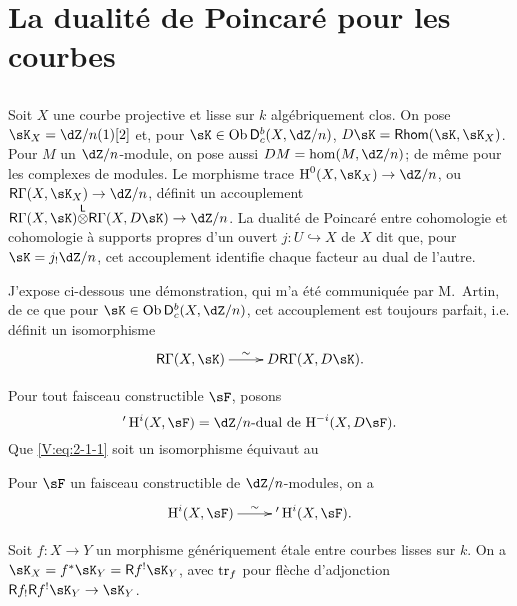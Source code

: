 \section{La dualité de Poincaré pour les courbes}\label{V:2}





\subsection{}\label{V:2-1}

Soit $X$ une courbe projective et lisse sur $k$ alg\'ebriquement clos. On pose 
$\sK_X=\dZ/n(1)[2]$ et, pour $\sK\in\ob \D_c^b(X,\dZ/n)$, 
$D\sK=\rHom(\sK,\sK_X)$. Pour $M$ un $\dZ/n$-module, on pose aussi 
$D M = \hom(M,\dZ/n)$; de m\^eme pour les complexes de modules. Le morphisme 
trace $\h^0(X,\sK_X) \to \dZ/n$, ou $\R\Gamma(X,\sK_X)\to \dZ/n$, d\'efinit un 
accouplement $\R\Gamma(X,\sK)\lotimes\R\Gamma(X,D\sK) \to \dZ/n$. La dualit\'e 
de Poincar\'e entre cohomologie et cohomologie \`a supports propres d'un ouvert 
$j:U\hookrightarrow X$ de $X$ dit que, pour $\sK=j_!\dZ/n$, cet accouplement 
identifie chaque facteur au dual de l'autre. 

J'expose ci-dessous une d\'emonstration, qui m'a \'et\'e communiqu\'ee par 
M.\ Artin, de ce que pour $\sK\in\ob\D_c^b(X,\dZ/n)$, cet accouplement est 
toujours parfait, i.e. d\'efinit un isomorphisme
\begin{equation}\label{V:eq:2-1-1}
\xymatrix{
  \R\Gamma(X,\sK) \ar[r]^-\sim 
    & D \R\Gamma(X,D\sK) \text{.}
}
\end{equation}

Pour tout faisceau constructible $\sF$, posons 
\[
  '\h^i(X,\sF) = \text{$\dZ/n$-dual de $\h^{-i}(X,D\sF)$.}
\]
Que \eqref{V:eq:2-1-1} soit un isomorphisme \'equivaut au 





\begin{theorem_}\label{V:2-2}
Pour $\sF$ un faisceau constructible de $\dZ/n$-modules, on a 
\begin{equation}\label{V:eq:2-2-1}
\xymatrix{
  \h^i(X,\sF) \ar[r]^-\sim 
    & '\h^i(X,\sF) \text{.}
}
\end{equation}
\end{theorem_}





\begin{lemma_}\label{V:2-3}
Soit $f:X\to Y$ un morphisme g\'en\'eriquement \'etale entre courbes lisses sur 
$k$. On a $\sK_X=f^\ast\sK_Y=\R f^!\sK_Y$, avec $\operatorname{tr}_f$ pour fl\`eche 
d'adjonction $\R f_!\R f^!\sK_Y\to \sK_Y$.
\end{lemma_}

